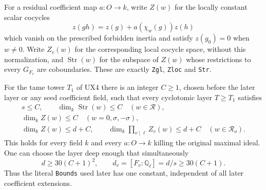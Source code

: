 For a residual coefficient map $a:O\to k$, write $Z(w)$ for
the locally constant scalar cocycles
\[
 z(gh)=z(g)+a(\chi_w(g))z(h)
 \tag{UX.23}
\]
which vanish on the prescribed forbidden inertia and satisfy
$z(g_0)=0$ when $w\ne0$.  Write $Z_v(w)$ for the corresponding
local cocycle space, without this normalization, and
$\operatorname{Str}(w)$ for the subspace of $Z(w)$ whose
restrictions to every $G_{F_v}$ are coboundaries.  These are
exactly \texttt{Zgl}, \texttt{Zloc} and \texttt{Str}.

\begin{proposition}
For the tame tower $T_1$ of UX4 there is an integer $C\ge1$,
chosen before the later layer or any seed coefficient field,
such that every cyclotomic layer $T\ge T_1$ satisfies
\[
 \begin{gathered}
 s\le C,\qquad
 \dim_k\operatorname{Str}(w)\le C\quad(w\in\mathcal R),\\
 \dim_k Z(w)\le C\quad(w=0,\sigma,-\sigma),\\
 \dim_k Z(w)\le d+C,\qquad
 \dim_k\prod_{v\mid\ell}Z_v(w)\le d+C
       \quad(w\in\mathcal R_o).
 \end{gathered}
 \tag{UX.24}
\]
This holds for every field $k$ and every $a:O\to k$ killing
the original maximal ideal.  One can choose the layer deep
enough that simultaneously
\[
 d\ge30(C+1)^2,\qquad d_v=[F_v:\mathbb Q_\ell]=d/s
                 \ge30(C+1).
 \tag{UX.25}
\]
Thus the literal \texttt{Bounds} used later has one
constant, independent of all later coefficient extensions.
\end{proposition}

